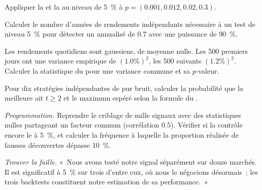\begin{exercise}[$\star$]\label{exo:qm:testing-and-multiple-testing:3}
Appliquer la  et la  au niveau de 5~\% à $p = (0.001, 0.012, 0.02, 0.3)$.
\end{exercise}

\begin{exercise}[$\star\star$]\label{exo:qm:testing-and-multiple-testing:4}
Calculer le nombre d'années de rendements indépendants nécessaire à un test de niveau 5~\% pour détecter un  annualisé de 0.7 avec une puissance de 90~\%.
\end{exercise}

\begin{exercise}[$\star\star$]\label{exo:qm:testing-and-multiple-testing:5}
Les rendements quotidiens sont gaussiens, de moyenne nulle. Les 500 premiers jours ont une variance empirique de $(1.0\%)^2$, les 500 suivants $(1.2\%)^2$. Calculer la
statistique du  pour une variance commune et sa $p$-valeur.
\end{exercise}

\begin{exercise}[$\star\star$]\label{exo:qm:testing-and-multiple-testing:6}
Pour dix stratégies indépendantes de pur bruit, calculer la probabilité que la meilleure ait $t \ge 2$ et le maximum
espéré selon la formule du .
\end{exercise}

\begin{exercise}[$\star\star\star$]\label{exo:qm:testing-and-multiple-testing:7}
\emph{Programmation.} Reprendre le criblage de mille signaux avec des statistiques nulles partageant un facteur commun (corrélation 0.5). Vérifier si
la  contrôle encore le  à 5~\%, et calculer la fréquence à laquelle
la proportion réalisée de fausses découvertes dépasse 10~\%.
\end{exercise}

\begin{exercise}[$\star\star\star$]\label{exo:qm:testing-and-multiple-testing:8}
\emph{Trouver la faille.} «~Nous avons testé notre signal séparément sur douze marchés. Il est significatif à 5~\% sur trois d'entre eux, où nous le
négocions désormais~; les trois backtests constituent notre estimation de sa performance.~»
\end{exercise}

